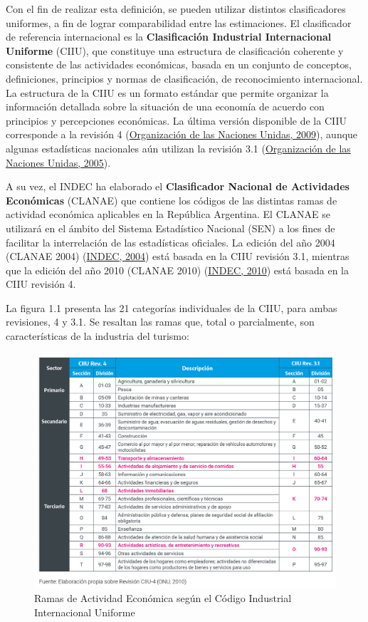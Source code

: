 \documentclass[
  openany]{book}
\begin{document}
Con el fin de realizar esta definición, se pueden utilizar distintos clasificadores uniformes, a fin de lograr comparabilidad entre las estimaciones. El clasificador de referencia internacional es la \textbf{Clasificación Industrial Internacional Uniforme} (CIIU), que constituye una estructura de clasificación coherente y consistente de las actividades económicas, basada en un conjunto de conceptos, definiciones, principios y normas de clasificación, de reconocimiento internacional. La estructura de la CIIU es un formato estándar que permite organizar la información detallada sobre la situación de una economía de acuerdo con principios y percepciones económicas. La última versión disponible de la CIIU corresponde a la revisión 4 (\protect\hyperlink{ref-ciiurev4}{Organización de las Naciones Unidas, 2009}), aunque algunas estadísticas nacionales aún utilizan la revisión 3.1 (\protect\hyperlink{ref-ciiurev3_1}{Organización de las Naciones Unidas, 2005}).

A su vez, el INDEC ha elaborado el \textbf{Clasificador Nacional de Actividades Económicas} (CLANAE) que contiene los códigos de las distintas ramas de actividad económica aplicables en la República Argentina. El CLANAE se utilizará en el ámbito del Sistema Estadístico Nacional (SEN) a los fines de facilitar la interrelación de las estadísticas oficiales. La edición del año 2004 (CLANAE 2004) (\protect\hyperlink{ref-clanae04}{INDEC, 2004}) está basada en la CIIU revisión 3.1, mientras que la edición del año 2010 (CLANAE 2010) (\protect\hyperlink{ref-clanae10}{INDEC, 2010}) está basada en la CIIU revisión 4.

La figura 1.1 presenta las 21 categorías individuales de la CIIU, para ambas revisiones, 4 y 3.1. Se resaltan las ramas que, total o parcialmente, son características de la industria del turismo:

\begin{figure}

{\centering \includegraphics[width=1\linewidth]{imagenes/figura1.1} 

}

\caption{Ramas de Actividad Económica según el Código Industrial Internacional Uniforme}\label{fig:ciiu}
\end{figure}
\end{document}

